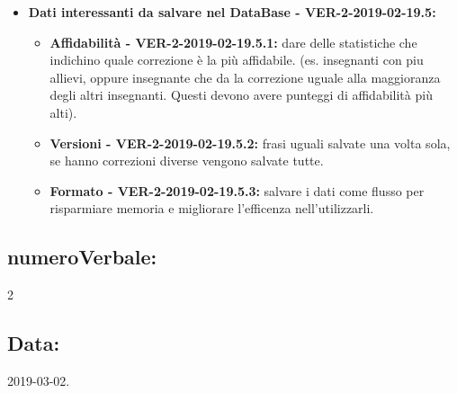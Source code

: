\documentclass[a4paper, oneside, openany, dvipsnames, table]{article}
\begin{document}
\begin{itemize}
	\item \textbf{Dati interessanti da salvare nel DataBase - VER-2-2019-02-19.5:}
	\begin{itemize}
		\item \textbf{Affidabilità - VER-2-2019-02-19.5.1:} dare delle statistiche che indichino quale correzione è la più affidabile.
		(es. insegnanti con piu allievi, oppure insegnante che da la correzione uguale alla maggioranza degli 
		altri insegnanti. Questi devono avere punteggi di affidabilità più alti). 
		\item \textbf{Versioni - VER-2-2019-02-19.5.2:} frasi uguali salvate una volta sola, se hanno correzioni diverse vengono salvate tutte.
		\item \textbf{Formato - VER-2-2019-02-19.5.3:} salvare i dati come flusso per risparmiare memoria e migliorare l'efficenza nell'utilizzarli.
	\end{itemize}

\end{itemize}

\subsection{numeroVerbale:} 2

\subsection{Data:} 2019-03-02.
\end{document}
